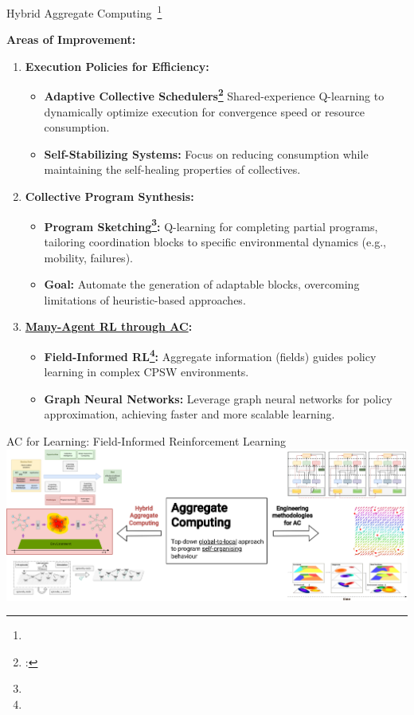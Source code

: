 \documentclass[presentation, 8pt,169]{beamer}\mode<presentation>{\usetheme{AMSBolognaFC}}
\begin{document}
\begin{frame}{Hybrid Aggregate Computing~\footnote[frame]{}}

  \textbf{Areas of Improvement:}
  
  \begin{enumerate}
  \item \textbf{Execution Policies for Efficiency:}
      \begin{itemize}
      \item \textbf{Adaptive Collective Schedulers\footnote{:}} Shared-experience Q-learning to dynamically optimize execution for convergence speed or resource consumption.
      \item \textbf{Self-Stabilizing Systems:} Focus on reducing consumption while maintaining the self-healing properties of collectives.
      \end{itemize}
  \item \textbf{Collective Program Synthesis:}
      \begin{itemize}
      \item \textbf{Program Sketching\footnote{}:} Q-learning for completing partial programs, tailoring coordination blocks to specific environmental dynamics (e.g., mobility, failures).
      \item \textbf{Goal:} Automate the generation of adaptable blocks, overcoming limitations of heuristic-based approaches.
      \end{itemize}
  \item \textbf{\underline{Many-Agent RL through AC}:}
      \begin{itemize}
      \item \textbf{Field-Informed RL\footnote{}:} Aggregate information (fields) guides policy learning in complex CPSW environments.
      \item \textbf{Graph Neural Networks:} Leverage graph neural networks for policy approximation, achieving faster and more scalable learning.
      \end{itemize}
  \end{enumerate}
  
\end{frame}
\begin{frame}{AC for Learning: Field-Informed Reinforcement Learning}
\includegraphics[width=\textwidth]{img/contribution-focus.drawio.png}
\end{frame}
\end{document}
